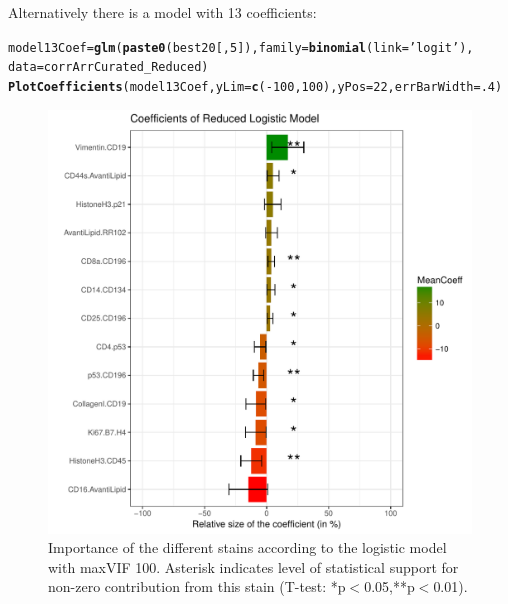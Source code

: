 \documentclass[a4paper]{article}\usepackage[]{graphicx}\usepackage[]{color}
\makeatletter
\def\maxwidth{ %
  \ifdim\Gin@nat@width>\linewidth
    \linewidth
  \else
    \Gin@nat@width
  \fi
}
\newcommand{\hlnum}[1]{\textcolor[rgb]{0.686,0.059,0.569}{#1}}%
\newcommand{\hlstr}[1]{\textcolor[rgb]{0.192,0.494,0.8}{#1}}%
\newcommand{\hlopt}[1]{\textcolor[rgb]{0,0,0}{#1}}%
\newcommand{\hlstd}[1]{\textcolor[rgb]{0.345,0.345,0.345}{#1}}%
\newcommand{\hlkwb}[1]{\textcolor[rgb]{0.69,0.353,0.396}{#1}}%
\newcommand{\hlkwc}[1]{\textcolor[rgb]{0.333,0.667,0.333}{#1}}%
\newcommand{\hlkwd}[1]{\textcolor[rgb]{0.737,0.353,0.396}{\textbf{#1}}}%
\newenvironment{kframe}{%
 \def\at@end@of@kframe{}%
 \ifinner\ifhmode%
  \def\at@end@of@kframe{\end{minipage}}%
  \begin{minipage}{\columnwidth}%
 \fi\fi%
 \def\FrameCommand##1{\hskip\@totalleftmargin \hskip-\fboxsep
 \colorbox{shadecolor}{##1}\hskip-\fboxsep
     \hskip-\linewidth \hskip-\@totalleftmargin \hskip\columnwidth}%
 \MakeFramed {\advance\hsize-\width
   \@totalleftmargin\z@ \linewidth\hsize
   \@setminipage}}%
 {\par\unskip\endMakeFramed%
 \at@end@of@kframe}
\newenvironment{knitrout}{}{} %
\makeatother
\begin{document}
Alternatively there is a model with 13 coefficients:
\begin{knitrout}
\color{fgcolor}\begin{kframe}
\begin{alltt}
\hlstd{model13Coef} \hlkwb{=} \hlkwd{glm}\hlstd{(}\hlkwd{paste0}\hlstd{(best20[,}\hlnum{5}\hlstd{]),}\hlkwc{family}\hlstd{=}\hlkwd{binomial}\hlstd{(}\hlkwc{link}\hlstd{=}\hlstr{'logit'}\hlstd{),}
                           \hlkwc{data}\hlstd{=corrArrCurated_Reduced)}
\hlkwd{PlotCoefficients}\hlstd{(model13Coef,}\hlkwc{yLim}\hlstd{=}\hlkwd{c}\hlstd{(}\hlopt{-}\hlnum{100}\hlstd{,}\hlnum{100}\hlstd{),}\hlkwc{yPos}\hlstd{=}\hlnum{22}\hlstd{,}\hlkwc{errBarWidth}\hlstd{=}\hlnum{.4}\hlstd{)}
\end{alltt}
\end{kframe}\begin{figure}[h]
\includegraphics[width=\maxwidth]{figure/Fig_Model13Coef-1} \caption[Importance of the different stains according to the logistic model with maxVIF 100]{Importance of the different stains according to the logistic model with maxVIF 100. Asterisk indicates level of statistical support for non-zero contribution from this stain (T-test: *p$<$0.05,**p$<$0.01).}\label{fig:Fig_Model13Coef}
\end{figure}


\end{knitrout}
\end{document}
